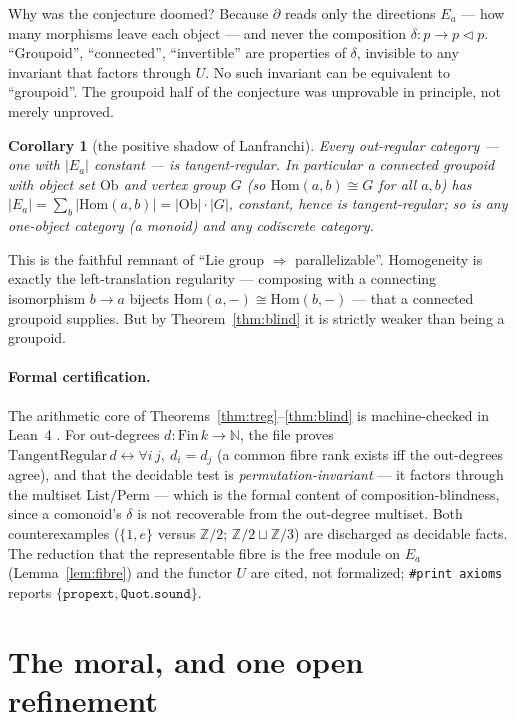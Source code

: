 \documentclass[11pt]{article}
\newtheorem{corollary}[theorem]{Corollary}
\theoremstyle{definition}
\newcommand{\Ob}{\mathrm{Ob}}
\newcommand{\Hom}{\mathrm{Hom}}
\newcommand{\N}{\mathbb{N}}
\newcommand{\Z}{\mathbb{Z}}
\begin{document}
Why was the conjecture doomed? Because $\partial$ reads only the directions $E_a$ --- how many
morphisms leave each object --- and never the composition $\delta\colon p\to p\lhd p$. ``Groupoid'',
``connected'', ``invertible'' are properties of $\delta$, invisible to any invariant that factors
through $U$. No such invariant can be equivalent to ``groupoid''. The groupoid half of the
conjecture was unprovable in principle, not merely unproved.

\begin{corollary}[the positive shadow of Lanfranchi]\label{cor:shadow}
Every out-regular category --- one with $|E_a|$ constant --- is tangent-regular. In particular a
connected groupoid with object set $\Ob$ and vertex group $G$ (so $\Hom(a,b)\cong G$ for all
$a,b$) has $|E_a|=\sum_b|\Hom(a,b)|=|\Ob|\cdot|G|$, constant, hence is tangent-regular; so is any
one-object category (a monoid) and any codiscrete category.
\end{corollary}

This is the faithful remnant of ``Lie group $\Rightarrow$ parallelizable''. Homogeneity is exactly
the left-translation regularity --- composing with a connecting isomorphism $b\to a$ bijects
$\Hom(a,-)\cong\Hom(b,-)$ --- that a connected groupoid supplies. But by Theorem~\ref{thm:blind} it
is strictly weaker than being a groupoid.

\paragraph{Formal certification.}
The arithmetic core of Theorems~\ref{thm:treg}--\ref{thm:blind} is machine-checked in Lean~4
\cite{MacBethLean}. For out-degrees $d\colon\mathrm{Fin}\,k\to\N$, the file proves
$\mathrm{TangentRegular}\,d \leftrightarrow \forall i\,j,\ d_i=d_j$ (a common fibre rank exists iff
the out-degrees agree), and that the decidable test is \emph{permutation-invariant} --- it factors
through the multiset $\mathrm{List}/\mathrm{Perm}$ --- which is the formal content of
composition-blindness, since a comonoid's $\delta$ is not recoverable from the out-degree multiset.
Both counterexamples ($\{1,e\}$ versus $\Z/2$; $\Z/2\sqcup\Z/3$) are discharged as decidable facts.
The reduction that the representable fibre is the free module on $E_a$ (Lemma~\ref{lem:fibre}) and
the functor $U$ are cited, not formalized; \texttt{\#print axioms} reports
$\{\texttt{propext},\texttt{Quot.sound}\}$.

\section{The moral, and one open refinement}\label{sec:conclusion}
\end{document}
